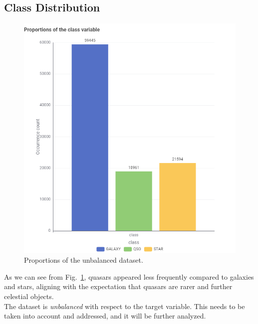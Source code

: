 \bigskip

\subsection{Class Distribution}
\begin{figure}[H]
    \centering
    \includegraphics[width=1\columnwidth]{images/Bar Chart.png}
    \caption{Proportions of the unbalanced dataset.}
    \label{fig:classes}
\end{figure}

As we can see from Fig.~\ref{fig:classes}, quasars appeared less frequently compared to galaxies and stars, aligning with the expectation that quasars are rarer and further celestial objects.\\The dataset is \textit{unbalanced} with respect to the target variable. This needs to be taken into account and addressed, and it will be further analyzed.
